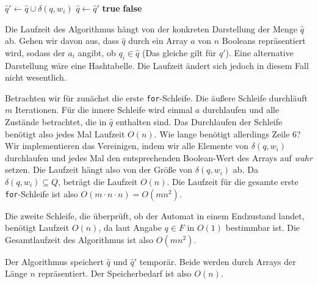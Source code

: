 \documentclass[11pt,a4paper]{article}
\begin{document}
\begin{loesung}
\begin{enumerate}
\begin{algorithmic}[1]
                        \State $\hat{q}' \gets \hat{q} \cup \delta(q, w_i)$
                    \EndFor
                    \State $\hat{q} \gets \hat{q}'$
                \EndFor
                        \State \Return \textbf{true}
                    \EndIf
                \EndFor
                \State \Return \textbf{false}
            \EndProcedure
        \end{algorithmic}
        Die Laufzeit des Algorithmus hängt von der konkreten Darstellung der Menge $\hat{q}$ ab.
        Gehen wir davon aus, dass $\hat{q}$ durch ein Array $a$ von $n$ Booleans repräsentiert wird, sodass der $a_i$ angibt, ob $q_i \in \hat{q}$ (Das gleiche gilt für $\hat{q}'$).
        Eine alternative Darstellung wäre eine Hashtabelle. Die Laufzeit ändert sich jedoch in diesem Fall nicht wesentlich.

        Betrachten wir für zunächst die erste \texttt{for}-Schleife.
        Die äußere Schleife durchläuft $m$ Iterationen.
        Für die innere Schleife wird einmal $a$ durchlaufen und alle Zustände betrachtet, die in $\hat{q}$ enthalten sind.
        Das Durchlaufen der Schleife benötigt also jedes Mal Laufzeit $O(n)$.
        Wie lange benötigt allerdings Zeile 6?
        Wir implementieren das Vereinigen, indem wir alle Elemente von $\delta(q, w_i)$ durchlaufen und jedes Mal den entsprechenden Boolean-Wert des Arrays auf \emph{wahr} setzen.
        Die Laufzeit hängt also von der Größe von $\delta(q, w_i)$ ab.
        Da $\delta(q, w_i) \subseteq Q$, beträgt die Laufzeit $O(n)$.
        Die Laufzeit für die gesamte erste \texttt{for}-Schleife ist also $O(m \cdot n \cdot n) = O(m n^2)$.

        Die zweite Schleife, die überprüft, ob der Automat in einem Endzustand landet, benötigt Laufzeit $O(n)$, da laut Angabe $q \in F$ in $O(1)$ bestimmbar ist.
        Die Gesamtlaufzeit des Algorithmus ist also $O(mn^2)$.

        Der Algorithmus speichert $\hat{q}$ und $\hat{q}'$ temporär.
        Beide werden durch Arrays der Länge $n$ repräsentiert.
        Der Speicherbedarf ist also $O(n)$.
    \end{enumerate}
\end{loesung}
\end{document}
